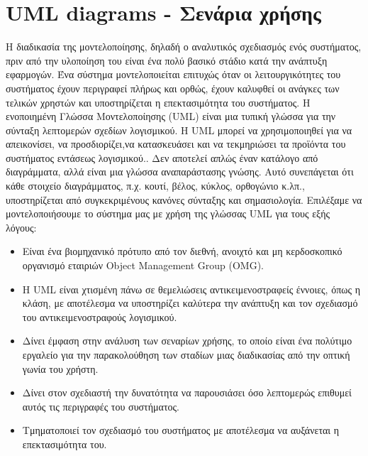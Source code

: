 \section{UML diagrams - Σενάρια χρήσης  }
	Η διαδικασία της μοντελοποίησης, δηλαδή ο αναλυτικός σχεδιασμός ενός συστήματος, πριν από την υλοποίηση του είναι ένα πολύ βασικό στάδιο κατά την ανάπτυξη εφαρμογών. Ένα σύστημα μοντελοποιείται επιτυχώς όταν οι λειτουργικότητες του συστήματος έχουν περιγραφεί πλήρως και ορθώς, έχουν καλυφθεί οι ανάγκες των τελικών χρηστών και υποστηρίζεται η επεκτασιμότητα του συστήματος. 
	Η ενοποιημένη Γλώσσα Μοντελοποίησης (UML) είναι μια τυπική γλώσσα για την σύνταξη λεπτομερών σχεδίων λογισμικού. Η UML μπορεί να χρησιμοποιηθεί για να απεικονίσει, να προσδιορίζει,να κατασκευάσει και να τεκμηριώσει τα προϊόντα του συστήματος εντάσεως λογισμικού.\cite{Booch2005}. Δεν αποτελεί απλώς έναν κατάλογο από διαγράμματα, αλλά είναι μια γλώσσα αναπαράστασης γνώσης. Αυτό συνεπάγεται ότι κάθε στοιχείο διαγράμματος, π.χ. κουτί, βέλος, κύκλος, ορθογώνιο κ.λπ., υποστηρίζεται από συγκεκριμένους κανόνες σύνταξης και σημασιολογία.
	 Επιλέξαμε να μοντελοποιήσουμε το σύστημα μας με χρήση της γλώσσας UML για τους εξής λόγους:
	 \begin{itemize}
	 \item Είναι ένα βιομηχανικό πρότυπο από τον διεθνή, ανοιχτό και μη κερδοσκοπικό οργανισμό εταιριών Object Management Group (OMG).
	 \item Η UML είναι χτισμένη πάνω σε θεμελιώσεις αντικειμενοστραφείς έννοιες, όπως η κλάση, με αποτέλεσμα να υποστηρίζει καλύτερα την ανάπτυξη και τον σχεδιασμό του αντικειμενοστραφούς λογισμικού.
	 \item Δίνει έμφαση στην ανάλυση των σεναρίων χρήσης, το οποίο είναι ένα πολύτιμο εργαλείο για την παρακολούθηση των σταδίων μιας διαδικασίας από την οπτική γωνία του χρήστη.
	 \item Δίνει στον σχεδιαστή την δυνατότητα να παρουσιάσει όσο λεπτομερώς επιθυμεί αυτός τις περιγραφές του συστήματος.
	 \item Τμηματοποιεί τον σχεδιασμό του συστήματος με αποτέλεσμα να αυξάνεται η επεκτασιμότητα του.
\end{itemize}	 

